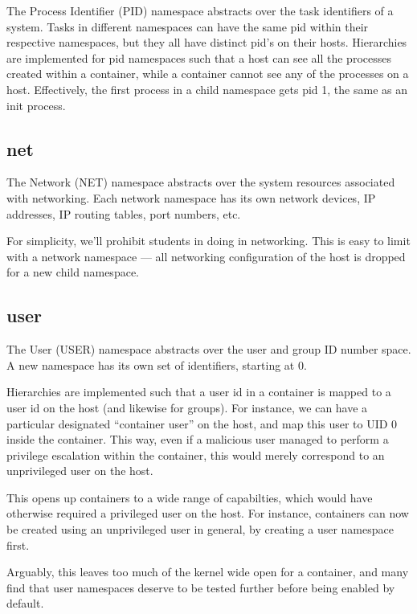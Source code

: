 The Process Identifier (PID) namespace abstracts over the task identifiers of a
system. Tasks in different namespaces can have the same pid within their
respective namespaces, but they all have distinct pid's on their hosts.
Hierarchies are implemented for pid namespaces such that a host can see all the
processes created within a container, while a container cannot see any of the
processes on a host. Effectively, the first process in a child namespace gets
pid 1, the same as an init process.

\subsection{net}

The Network (NET) namespace abstracts over the system resources associated with
networking. Each network namespace has its own network devices, IP addresses,
IP routing tables, port numbers, etc.

For simplicity, we'll prohibit students in doing in networking. This is easy to
limit with a network namespace --- all networking configuration of the host is
dropped for a new child namespace.

\subsection{user}

\label{section:sandboxing:namespaces:user}

The User (USER) namespace abstracts over the user and group ID number space.
A new namespace has its own set of identifiers, starting at 0.

Hierarchies are implemented such that a user id in a container is mapped to a
user id on the host (and likewise for groups). For instance, we can have a
particular designated ``container user'' on the host, and map this user to UID
0 inside the container. This way, even if a malicious user managed to perform a
privilege escalation within the container, this would merely correspond to an
unprivileged user on the host.

This opens up containers to a wide range of capabilties, which would have
otherwise required a privileged user on the host. For instance, containers can
now be created using an unprivileged user in general, by creating a user
namespace first.

Arguably, this leaves too much of the kernel wide open for a container, and
many find that user namespaces deserve to be tested further before being
enabled by default\cite{kerrisk-2013, arch-linux-userns,fedora-userns}.
